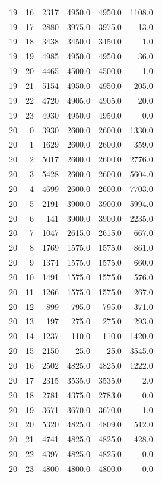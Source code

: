 \begin{longtable}{rrrrrr}
19 & 16 & 2317 & 4950.0 & 4950.0 & 1108.0\\
19 & 17 & 2880 & 3975.0 & 3975.0 & 13.0\\
19 & 18 & 3438 & 3450.0 & 3450.0 & 1.0\\
19 & 19 & 4985 & 4950.0 & 4950.0 & 36.0\\
19 & 20 & 4465 & 4500.0 & 4500.0 & 1.0\\
19 & 21 & 5154 & 4950.0 & 4950.0 & 205.0\\
19 & 22 & 4720 & 4905.0 & 4905.0 & 20.0\\
19 & 23 & 4930 & 4950.0 & 4950.0 & 0.0\\
20 & 0 & 3930 & 2600.0 & 2600.0 & 1330.0\\
20 & 1 & 1629 & 2600.0 & 2600.0 & 359.0\\
20 & 2 & 5017 & 2600.0 & 2600.0 & 2776.0\\
20 & 3 & 5428 & 2600.0 & 2600.0 & 5604.0\\
20 & 4 & 4699 & 2600.0 & 2600.0 & 7703.0\\
20 & 5 & 2191 & 3900.0 & 3900.0 & 5994.0\\
20 & 6 & 141 & 3900.0 & 3900.0 & 2235.0\\
20 & 7 & 1047 & 2615.0 & 2615.0 & 667.0\\
20 & 8 & 1769 & 1575.0 & 1575.0 & 861.0\\
20 & 9 & 1374 & 1575.0 & 1575.0 & 660.0\\
20 & 10 & 1491 & 1575.0 & 1575.0 & 576.0\\
20 & 11 & 1266 & 1575.0 & 1575.0 & 267.0\\
20 & 12 & 899 & 795.0 & 795.0 & 371.0\\
20 & 13 & 197 & 275.0 & 275.0 & 293.0\\
20 & 14 & 1237 & 110.0 & 110.0 & 1420.0\\
20 & 15 & 2150 & 25.0 & 25.0 & 3545.0\\
20 & 16 & 2502 & 4825.0 & 4825.0 & 1222.0\\
20 & 17 & 2315 & 3535.0 & 3535.0 & 2.0\\
20 & 18 & 2781 & 4375.0 & 2783.0 & 0.0\\
20 & 19 & 3671 & 3670.0 & 3670.0 & 1.0\\
20 & 20 & 5320 & 4825.0 & 4809.0 & 512.0\\
20 & 21 & 4741 & 4825.0 & 4825.0 & 428.0\\
20 & 22 & 4397 & 4825.0 & 4825.0 & 0.0\\
20 & 23 & 4800 & 4800.0 & 4800.0 & 0.0\\

\end{longtable}
